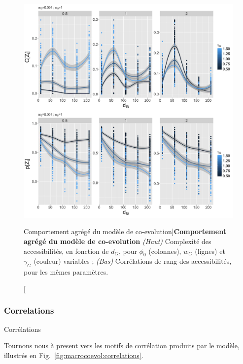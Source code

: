\begin{figure}
\includegraphics[width=\linewidth]{Figures/Final/6-2-2-fig-macrocoevol-behavior-aggreg.jpg}
\caption[][Comportement agrégé du modèle de co-evolution]{}{\textbf{Comportement agrégé du modèle de co-evolution} \textit{(Haut)} Complexité des accessibilités, en fonction de $d_G$, pour $\phi_0$ (colonnes), $w_G$ (lignes) et $\gamma_G$ (couleur) variables ; \textit{(Bas)} Corrélations de rang des accessibilités, pour les mêmes paramètres.\label{fig:macrocoevol:behavior-aggreg}}
\end{figure}



\subsubsection{Correlations}{Corrélations}


Tournons nous à present vers les motifs de corrélation produits par le modèle, illustrés en Fig.~\ref{fig:macrocoevol:correlations}.


